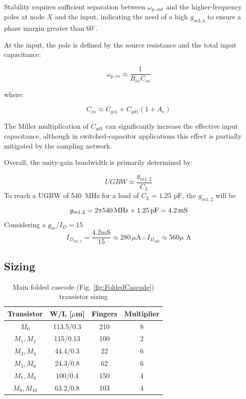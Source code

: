 \documentclass[11pt,a4paper]{article}
\begin{document}
Stability requires sufficient separation between $\omega_{p,out}$ and the higher-frequency poles at node $X$ and the input, indicating the need of a high $g_{m3,4}$ to ensure a phase margin greater than $60^\circ$.

At the input, the pole is defined by the source resistance and the total input capacitance:

\begin{equation}
\omega_{p,in} \approx \frac{1}{R_{in} C_{in}}
\end{equation}

where:

\begin{equation}
C_{in} \approx C_{gs1} + C_{gd1}(1 + A_v)
\end{equation}

The Miller multiplication of $C_{gd1}$ can significantly increase the effective input capacitance, although in switched-capacitor applications this effect is partially mitigated by the sampling network.

Overall, the unity-gain bandwidth is primarily determined by:

\begin{equation}
UGBW \approx \frac{g_{m1,2}}{C_L}
\end{equation}
To reach a UGBW of 540~MHz for a load of $C_L=1.25$ pF, the $g_{m1,2}$ will be
\begin{equation}
  g_{m1,2} = 2\pi 540\,\text{MHz} \times 1.25\,\text{pF} = 4.2\,\text{mS} \\
\end{equation}
Considering a $g_m/I_{D}=15$
\begin{equation}
  I_{D_{M1,2}} = \frac{4.2\text{mS}}{15} \approx 280\,\text{$\mu$A} \,\therefore\, I_{D_{M0}} \approx 560\text{$\mu$ A}
\end{equation}

\subsection{Sizing}
\begin{table}[h]
\centering
\caption{Main folded cascode (Fig. \ref{fig:FoldedCascode}) transistor sizing}
\begin{tabular}{c c c c}
\hline
\textbf{Transistor} & \textbf{W/L [$\mu$m]} & \textbf{Fingers} & \textbf{Multiplier} \\
\hline
$M_0$            & 113.5/0.3 &210 &8 \\
$M_1, M_2$       & 115/0.13  &100 &2 \\
$M_3, M_4$       & 44.4/0.3  &22  &6 \\
$M_5, M_6$       & 24.3/0.8  &62  &6 \\
$M_7, M_8$       & 100/0.4   &150 &4 \\
$M_9, M_{10}$    & 63.2/0.8  &103 &4 \\
\hline
\end{tabular}
\end{table}
\end{document}
